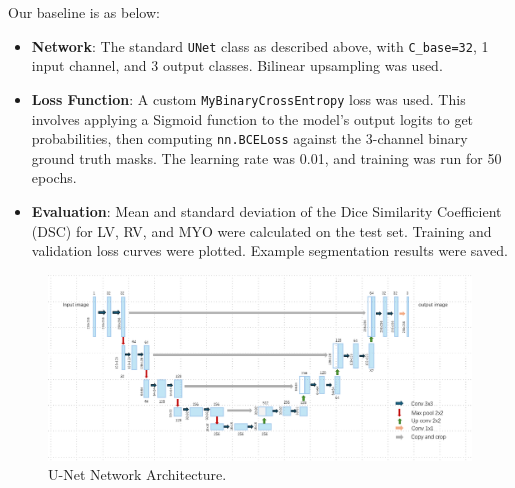 \documentclass{article}
\begin{document}
Our baseline is as below:
\begin{itemize}
  \item \textbf{Network}: The standard \texttt{UNet} class as described above, with \texttt{C\_base=32}, 1 input channel,
        and 3 output classes. Bilinear upsampling was used.
  \item \textbf{Loss Function}: A custom \texttt{MyBinaryCrossEntropy} loss was used. This involves applying a Sigmoid
        function to the model's output logits to get probabilities, then computing \texttt{nn.BCELoss} against the 3-channel
        binary ground truth masks. The learning rate was 0.01, and training was run for 50 epochs.
  \item \textbf{Evaluation}: Mean and standard deviation of the Dice Similarity Coefficient (DSC) for LV, RV, and MYO
        were calculated on the test set. Training and validation loss curves were plotted.
        Example segmentation results were saved.
\end{itemize}

\begin{figure}[H]
  \centering
  \includegraphics[width=0.8\linewidth]{../result/network.png}
  \caption{U-Net Network Architecture.}
  \label{fig:network_architecture}
\end{figure}
\end{document}
